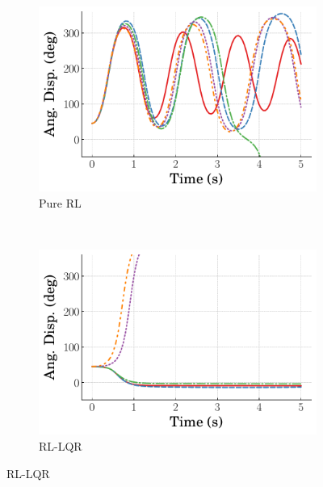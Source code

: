 \begin{figure}[h!]
    \centering
    \begin{subfigure}[b]{0.49\textwidth}
        \centering
        \includegraphics[width=\textwidth]{figures/figures_RL_model_based_control/time_responses_invpend/invpend_pure_RL/Angular_displacement_45_init_0_steps.pdf}
        \caption{Pure RL}
        \label{subfig_chap2:invpend_near_resp_0steps_pure_RL}
    \end{subfigure}\\
    \hfill
    \begin{subfigure}[b]{0.49\textwidth}
        \centering
        \includegraphics[width=\textwidth]{figures/figures_RL_model_based_control/time_responses_invpend/invpend_RL_LQR/Angular_displacement_45_init_0_steps.pdf}
        \caption{RL-LQR}
        \label{subfig_chap2:invpend_near_resp_0steps_RL_LQR}
    \end{subfigure}

\end{figure}

